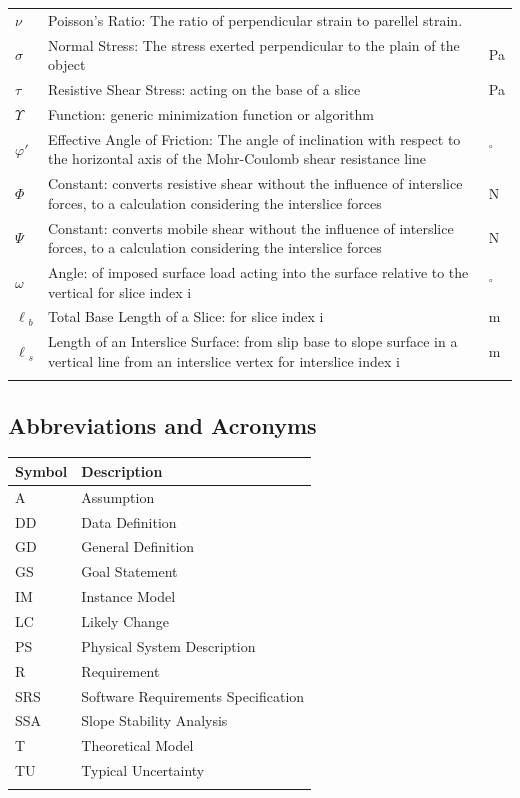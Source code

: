 \documentclass[12pt]{article}
\begin{document}
\begin{longtabu}{l X[l] l}
\\
$\nu{}$ & Poisson's Ratio: The ratio of perpendicular strain to parellel strain. & 
\\
$\sigma{}$ & Normal Stress: The stress exerted perpendicular to the plain of the object & Pa
\\
$\tau{}$ & Resistive Shear Stress: acting on the base of a slice & Pa
\\
$\Upsilon{}$ & Function: generic minimization function or algorithm & 
\\
$\varphi{}'$ & Effective Angle of Friction: The angle of inclination with respect to the horizontal axis of the Mohr-Coulomb shear resistance line & ${}^{\circ}$
\\
$\Phi{}$ & Constant: converts resistive shear without the influence of interslice forces, to a calculation considering the interslice forces & N
\\
$\Psi{}$ & Constant: converts mobile shear without the influence of interslice forces, to a calculation considering the interslice forces & N
\\
$\omega{}$ & Angle: of imposed surface load acting into the surface relative to the vertical for slice index i & ${}^{\circ}$
\\
${\ell{}_{b}}$ & Total Base Length of a Slice: for slice index i & m
\\
${\ell{}_{s}}$ & Length of an Interslice Surface: from slip base to slope surface in a vertical line from an interslice vertex for interslice index i & m
\\
\bottomrule
\label{Table:TablofSymb}
\end{longtabu}
\subsection{Abbreviations and Acronyms}
\label{Sec:AbbrandAcro}
\begin{longtable*}{l l}
\toprule
Symbol & Description
\\
\midrule
A & Assumption
\\
DD & Data Definition
\\
GD & General Definition
\\
GS & Goal Statement
\\
IM & Instance Model
\\
LC & Likely Change
\\
PS & Physical System Description
\\
R & Requirement
\\
SRS & Software Requirements Specification
\\
SSA & Slope Stability Analysis
\\
T & Theoretical Model
\\
TU & Typical Uncertainty
\\
\bottomrule
\label{Table:AbbrandAcro}
\end{longtable*}
\end{document}
